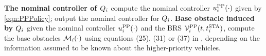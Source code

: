 \begin{algorithm}[tb!]
{			\textbf{The nominal controller of $Q_{i}$} \;
			compute the nominal controller ${u^{\text{PP}}_{i}}(\cdot)$ given by \eqref{eqn:PPPolicy};\;
			output the nominal controller for $Q_i$.\;
			\textbf{Base obstacle induced by $Q_{i}$} \;
			given the nominal controller ${u^{\text{PP}}_{i}}(\cdot)$ and the BRS $\mathcal{V}^{\text{PP}}_{i}(t, t^\text{STA}_i)$, compute the base obstacles $\mathcal{M}_i(\cdot)$ using equations (25), (31) or (37) in \cite{Chen2016d}, depending on the information assumed to be known about the higher-priority vehicles.
		}
\end{algorithm}
%